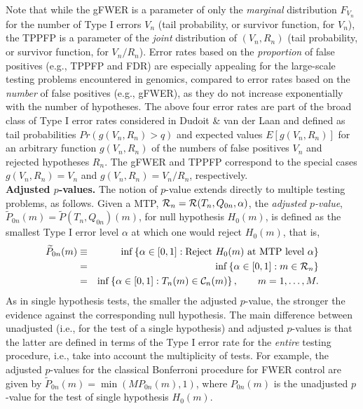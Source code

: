 \documentclass[11pt]{article}
\begin{document}
Note that while the gFWER is a parameter of only the {\em marginal} distribution $F_{V_n}$ for the number of Type I errors $V_n$ (tail probability, or survivor function, for $V_n$), the TPPFP is a parameter of the {\em joint} distribution of $(V_n,R_n)$ (tail probability, or survivor function, for $V_n/R_n$). 
 Error rates based on the {\em proportion} of false positives (e.g., TPPFP and FDR) are especially appealing for the large-scale testing problems encountered in genomics, compared to error rates based on the {\em number} of false positives (e.g., gFWER), as they do not increase exponentially with the number of hypotheses. 
The above four error rates are part of the broad class of Type I error rates considered in Dudoit \& van der Laan \cite{Dudoit&vdLaanMTBook} and defined as tail probabilities $Pr(g(V_n,R_n) > q)$ and expected values $E[g(V_n,R_n)]$ for an arbitrary function $g(V_n,R_n)$ of the numbers of false positives $V_n$ and rejected hypotheses $R_n$. The gFWER and TPPFP correspond to the special cases $g(V_n,R_n) = V_n$ and $g(V_n,R_n) = V_n/R_n$, respectively.\\


\noindent
{\bf Adjusted $p$-values.} The notion of $p$-value extends directly to multiple testing problems, as follows. 
Given a MTP, ${\cal R}_n = {\cal R}(T_n,Q_{0n}, \alpha)$, the {\em adjusted $p$-value}, $\widetilde{P}_{0n}(m) = \widetilde{P}(T_n,Q_{0n})(m)$, for null hypothesis $H_0(m)$, is defined as the smallest Type I error level $\alpha$ at which one would reject $H_0(m)$, that is,
\begin{eqnarray}
\widetilde{P}_{0n}(m) &\equiv& \inf \left \{ \alpha \in [0,1]: \mbox{Reject $H_0(m)$ at MTP level $\alpha$}\right \}\\
&=& \inf\left \{\alpha \in [0,1]: m \in {\cal R}_n \right \}\nonumber \\
&=& \inf\left \{\alpha \in [0,1]: T_n(m) \in {\cal C}_n(m) \right \}, \qquad m=1,\ldots, M.\nonumber
\end{eqnarray}
As in single hypothesis tests, the smaller the adjusted $p$-value, the stronger the evidence against the corresponding null hypothesis. The main difference between unadjusted (i.e., for the test of a single hypothesis) and adjusted $p$-values is that the latter are defined in terms of the Type I error rate for the {\em entire} testing procedure, i.e., take into account the multiplicity of tests.
For example, the adjusted $p$-values for the classical Bonferroni procedure for FWER control are given by $\widetilde{P}_{0n}(m) = \min(M P_{0n}(m), 1)$, 
where $P_{0n}(m)$ is the unadjusted $p$-value for the test of single hypothesis $H_0(m)$.
\end{document}
